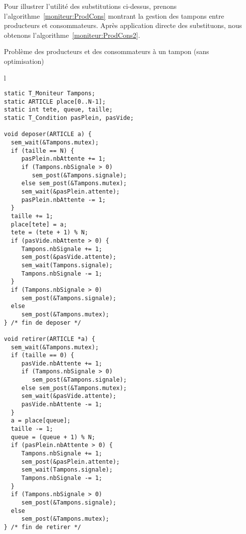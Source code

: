 Pour illustrer l'utilité des substitutions ci-dessus, prenons l'algorithme~\ref{moniteur:ProdCons} montrant la gestion des tampons entre producteurs et consommateurs. Après application directe des substituons, nous obtenons l'algorithme~\ref{moniteur:ProdCons2}.
\begin{algorithm}[!ht]
\caption{Problème des producteurs et des consommateurs à un tampon (sans optimisation)}\label{moniteur:ProdCons2}
\begin{center}
\begin{tabular}{l}
\lstset{language=C++}
\begin{lstlisting}
static T_Moniteur Tampons;
static ARTICLE place[0..N-1];
static int tete, queue, taille;
static T_Condition pasPlein, pasVide;

void deposer(ARTICLE a) {
  sem_wait(&Tampons.mutex);
  if (taille == N) {
     pasPlein.nbAttente += 1;
     if (Tampons.nbSignale > 0)
        sem_post(&Tampons.signale);
     else sem_post(&Tampons.mutex);
     sem_wait(&pasPlein.attente);
     pasPlein.nbAttente -= 1;
  }
  taille += 1;
  place[tete] = a;
  tete = (tete + 1) % N;
  if (pasVide.nbAttente > 0) {
     Tampons.nbSignale += 1;
     sem_post(&pasVide.attente);
     sem_wait(Tampons.signale);
     Tampons.nbSignale -= 1;
  }
  if (Tampons.nbSignale > 0)
     sem_post(&Tampons.signale);
  else
     sem_post(&Tampons.mutex);
} /* fin de deposer */

void retirer(ARTICLE *a) {
  sem_wait(&Tampons.mutex);
  if (taille == 0) {
     pasVide.nbAttente += 1;
     if (Tampons.nbSignale > 0)
        sem_post(&Tampons.signale);
     else sem_post(&Tampons.mutex);
     sem_wait(&pasVide.attente);
     pasVide.nbAttente -= 1;
  }
  a = place[queue];
  taille -= 1;
  queue = (queue + 1) % N;
  if (pasPlein.nbAttente > 0) {
     Tampons.nbSignale += 1;
     sem_post(&pasPlein.attente);
     sem_wait(Tampons.signale);
     Tampons.nbSignale -= 1;
  }
  if (Tampons.nbSignale > 0)
     sem_post(&Tampons.signale);
  else
     sem_post(&Tampons.mutex);
} /* fin de retirer */
\end{lstlisting}
\end{tabular}
\end{center}
\end{algorithm}

